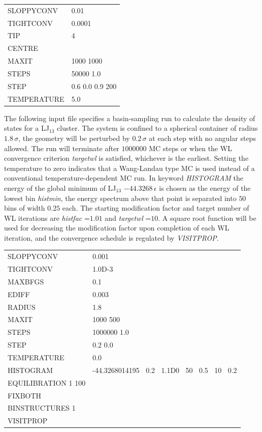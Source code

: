 \documentclass[12pt,a4paper,dvips]{article}
\begin{document}
\medskip
\begin{tabular}{ll}
SLOPPYCONV & 0.01 \\
TIGHTCONV & 0.0001 \\
TIP & 4 \\
CENTRE & \\
MAXIT & 1000 1000\\
STEPS & 50000 1.0\\
STEP & 0.6 0.0 0.9 200 \\
TEMPERATURE & 5.0\\
\end{tabular}
\medskip

\noindent The following input file specifies a basin-sampling run to calculate the density of states for 
a LJ$_{13}$ cluster. The system is
confined to a spherical container of radius $1.8\,\sigma$, 
the geometry will be perturbed by $0.2\,\sigma$ at each step with no
angular steps allowed. The run will terminate after $1000000$ 
MC steps or when the WL convergence criterion {\it targetwl}
is satisfied, whichever is the earliest. Setting the temperature to zero indicates that 
a Wang-Landau type MC is used instead of
a conventional temperature-dependent MC run. In keyword {\it HISTOGRAM\/}
the energy of the global minimum of LJ$_{13}$ $-44.3268\,\epsilon$ is chosen
as the energy of the lowest bin {\it histmin}, the energy spectrum above that point is 
separated into $50$ bins of width $0.25$ each. The
starting modification factor and target number of WL iterations are 
{\it histfac} =$ 1.01$ and {\it targetwl} =$ 10$. A square root function
will  be used for decreasing the modification factor upon completion of each WL iteration, 
and the convergence schedule is regulated by {\it VISITPROP}.  


\medskip
\begin{tabular}{ll}
SLOPPYCONV & 0.001 \\
TIGHTCONV & 1.0D-3 \\
MAXBFGS &  0.1 \\
EDIFF & 0.003 \\
RADIUS &  1.8 \\
MAXIT & 1000 500 \\
STEPS & 1000000 1.0 \\
STEP  & 0.2 0.0 \\
TEMPERATURE & 0.0 \\
HISTOGRAM & -44.3268014195 $\:$ 0.2 $\:$ 1.1D0 $\:$ 50 $\:$ 0.5 $\:$ 10 $\:$ 0.2 \\
EQUILIBRATION 1 100 \\
FIXBOTH \\
BINSTRUCTURES 1 \\
VISITPROP \\
\end{tabular}
\medskip
\end{document}
